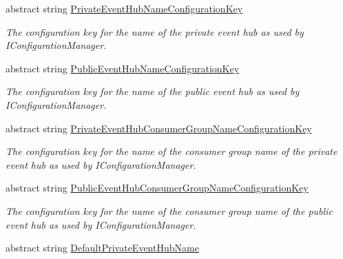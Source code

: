 \begin{DoxyCompactItemize}
abstract string \hyperlink{classCqrs_1_1Azure_1_1ServiceBus_1_1AzureEventHub_a286a7ddc6becff4d549434d2abe82ed1_a286a7ddc6becff4d549434d2abe82ed1}{Private\+Event\+Hub\+Name\+Configuration\+Key}
\begin{DoxyCompactList}\small\item\em The configuration key for the name of the private event hub as used by I\+Configuration\+Manager. \end{DoxyCompactList}\item 
abstract string \hyperlink{classCqrs_1_1Azure_1_1ServiceBus_1_1AzureEventHub_a3ef1f56ad3de3bf8337f68e73627fab2_a3ef1f56ad3de3bf8337f68e73627fab2}{Public\+Event\+Hub\+Name\+Configuration\+Key}
\begin{DoxyCompactList}\small\item\em The configuration key for the name of the public event hub as used by I\+Configuration\+Manager. \end{DoxyCompactList}\item 
abstract string \hyperlink{classCqrs_1_1Azure_1_1ServiceBus_1_1AzureEventHub_ad2095d284821cff883fef5a2a5aec90e_ad2095d284821cff883fef5a2a5aec90e}{Private\+Event\+Hub\+Consumer\+Group\+Name\+Configuration\+Key}
\begin{DoxyCompactList}\small\item\em The configuration key for the name of the consumer group name of the private event hub as used by I\+Configuration\+Manager. \end{DoxyCompactList}\item 
abstract string \hyperlink{classCqrs_1_1Azure_1_1ServiceBus_1_1AzureEventHub_a36b035065fd3fc38ac136adc59742d34_a36b035065fd3fc38ac136adc59742d34}{Public\+Event\+Hub\+Consumer\+Group\+Name\+Configuration\+Key}
\begin{DoxyCompactList}\small\item\em The configuration key for the name of the consumer group name of the public event hub as used by I\+Configuration\+Manager. \end{DoxyCompactList}\item 
abstract string \hyperlink{classCqrs_1_1Azure_1_1ServiceBus_1_1AzureEventHub_a8912bae90f45042ed41ff7a7632c178f_a8912bae90f45042ed41ff7a7632c178f}{Default\+Private\+Event\+Hub\+Name}

\end{DoxyCompactItemize}

